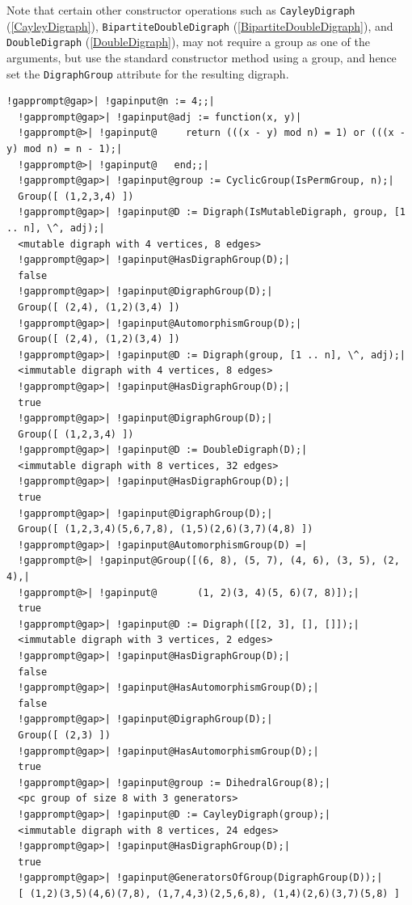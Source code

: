 \documentclass[a4paper,11pt]{report}
\begin{document}
{{{ Note that certain other constructor operations such as \texttt{CayleyDigraph} (\ref{CayleyDigraph}), \texttt{BipartiteDoubleDigraph} (\ref{BipartiteDoubleDigraph}), and \texttt{DoubleDigraph} (\ref{DoubleDigraph}), may not require a group as one of the arguments, but use the standard
constructor method using a group, and hence set the \texttt{DigraphGroup} attribute for the resulting digraph. 
\begin{Verbatim}[commandchars=!@|,fontsize=\small,frame=single,label=Example]
  !gapprompt@gap>| !gapinput@n := 4;;|
  !gapprompt@gap>| !gapinput@adj := function(x, y)|
  !gapprompt@>| !gapinput@     return (((x - y) mod n) = 1) or (((x - y) mod n) = n - 1);|
  !gapprompt@>| !gapinput@   end;;|
  !gapprompt@gap>| !gapinput@group := CyclicGroup(IsPermGroup, n);|
  Group([ (1,2,3,4) ])
  !gapprompt@gap>| !gapinput@D := Digraph(IsMutableDigraph, group, [1 .. n], \^, adj);|
  <mutable digraph with 4 vertices, 8 edges>
  !gapprompt@gap>| !gapinput@HasDigraphGroup(D);|
  false
  !gapprompt@gap>| !gapinput@DigraphGroup(D);|
  Group([ (2,4), (1,2)(3,4) ])
  !gapprompt@gap>| !gapinput@AutomorphismGroup(D);|
  Group([ (2,4), (1,2)(3,4) ])
  !gapprompt@gap>| !gapinput@D := Digraph(group, [1 .. n], \^, adj);|
  <immutable digraph with 4 vertices, 8 edges>
  !gapprompt@gap>| !gapinput@HasDigraphGroup(D);|
  true
  !gapprompt@gap>| !gapinput@DigraphGroup(D);|
  Group([ (1,2,3,4) ])
  !gapprompt@gap>| !gapinput@D := DoubleDigraph(D);|
  <immutable digraph with 8 vertices, 32 edges>
  !gapprompt@gap>| !gapinput@HasDigraphGroup(D);|
  true
  !gapprompt@gap>| !gapinput@DigraphGroup(D);|
  Group([ (1,2,3,4)(5,6,7,8), (1,5)(2,6)(3,7)(4,8) ])
  !gapprompt@gap>| !gapinput@AutomorphismGroup(D) =|
  !gapprompt@>| !gapinput@Group([(6, 8), (5, 7), (4, 6), (3, 5), (2, 4),|
  !gapprompt@>| !gapinput@       (1, 2)(3, 4)(5, 6)(7, 8)]);|
  true
  !gapprompt@gap>| !gapinput@D := Digraph([[2, 3], [], []]);|
  <immutable digraph with 3 vertices, 2 edges>
  !gapprompt@gap>| !gapinput@HasDigraphGroup(D);|
  false
  !gapprompt@gap>| !gapinput@HasAutomorphismGroup(D);|
  false
  !gapprompt@gap>| !gapinput@DigraphGroup(D);|
  Group([ (2,3) ])
  !gapprompt@gap>| !gapinput@HasAutomorphismGroup(D);|
  true
  !gapprompt@gap>| !gapinput@group := DihedralGroup(8);|
  <pc group of size 8 with 3 generators>
  !gapprompt@gap>| !gapinput@D := CayleyDigraph(group);|
  <immutable digraph with 8 vertices, 24 edges>
  !gapprompt@gap>| !gapinput@HasDigraphGroup(D);|
  true
  !gapprompt@gap>| !gapinput@GeneratorsOfGroup(DigraphGroup(D));|
  [ (1,2)(3,5)(4,6)(7,8), (1,7,4,3)(2,5,6,8), (1,4)(2,6)(3,7)(5,8) ]
\end{Verbatim}
 }

}}
\end{document}
